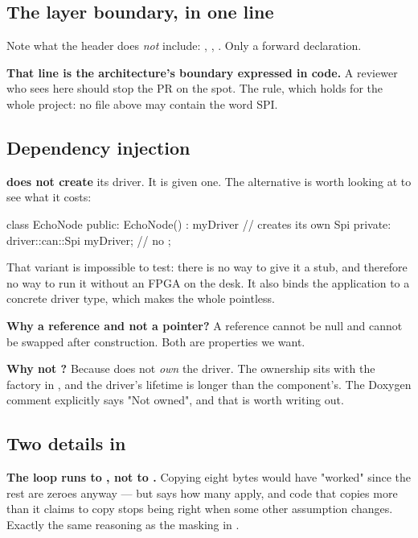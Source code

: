 \subsection{The layer boundary, in one line}

Note what the header does \emph{not} include: , ,
. Only a forward declaration.

\textbf{That line is the architecture's boundary expressed in code.} A reviewer who sees
 here should stop the PR on the spot. The rule, which holds
for the whole project: no file above  may contain the word SPI.

\subsection{Dependency injection}

 \textbf{does not create} its driver. It is given one. The alternative is worth
looking at to see what it costs:

\begin{cppcode}
class EchoNode
{
public:
    EchoNode() : myDriver{} {}   // creates its own Spi
private:
    driver::can::Spi myDriver;   // no
};
\end{cppcode}

That variant is impossible to test: there is no way to give it a stub, and therefore no way to run
it without an FPGA on the desk. It also binds the application to a concrete driver type, which
makes the whole  pointless.

\textbf{Why a reference and not a pointer?} A reference cannot be null and cannot be swapped after
construction. Both are properties we want.

\textbf{Why not ?} Because  does not \emph{own} the driver.
The ownership sits with the factory in , and the driver's lifetime is longer than
the component's. The Doxygen comment explicitly says "Not owned", and that is worth writing out.

\subsection{Two details in \texorpdfstring{}{run()}}

\textbf{The loop runs to , not to .} Copying eight bytes would
have "worked" since the rest are zeroes anyway --- but  says how many apply,
and code that copies more than it claims to copy stops being right when some other assumption
changes. Exactly the same reasoning as the masking in .


